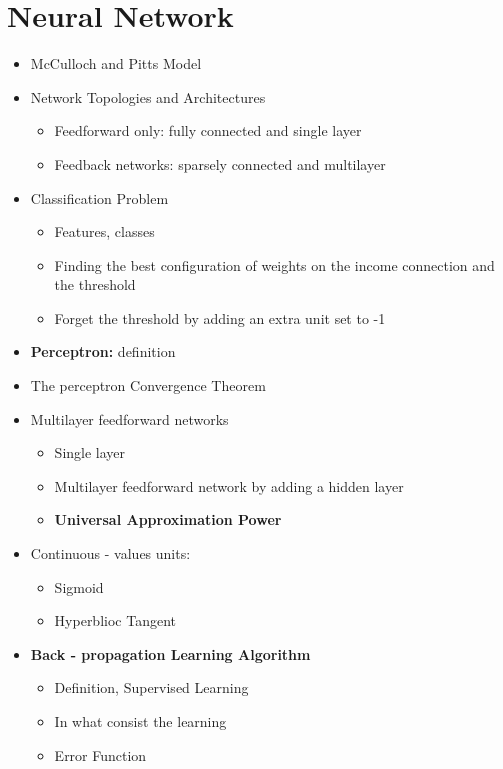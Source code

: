 \documentclass[12pt,oneside]{report}
\begin{document}
\section{Neural Network}
\begin{itemize}
    \item McCulloch and Pitts Model
    \item Network Topologies and Architectures
    \begin{itemize}
        \item Feedforward only: fully connected and single layer
        \item Feedback networks: sparsely connected and multilayer
    \end{itemize}
    \item Classification Problem
    \begin{itemize}
        \item Features, classes
        \item Finding the best configuration of weights on the income connection and the threshold
        \item Forget the threshold by adding an extra unit set to -1
    \end{itemize}
    \item \textbf{Perceptron:} definition
    \item The perceptron Convergence Theorem
    \item Multilayer feedforward networks
    \begin{itemize}
        \item Single layer
        \item Multilayer feedforward network by adding a hidden layer
        \item \textbf{Universal Approximation Power}
    \end{itemize}
    \item Continuous - values units:
    \begin{itemize}
        \item Sigmoid
        \item Hyperblioc Tangent
    \end{itemize}
    \item \textbf{Back - propagation Learning Algorithm}
    \begin{itemize}
        \item Definition, Supervised Learning
        \item In what consist the learning
        \item Error Function

\end{itemize}
\end{itemize}
\end{document}
